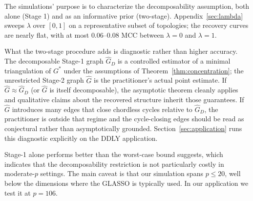 


The simulations' purpose is to characterize the decomposability assumption, both alone (Stage 1) and as an informative prior (two-stage). Appendix~\ref{sec:lambda} sweeps $\lambda$ over $[0,1]$ on a representative subset of topologies; the recovery curves are nearly flat, with at most $0.06$--$0.08$ MCC between $\lambda = 0$ and $\lambda = 1$.

What the two-stage procedure adds is diagnostic rather than higher accuracy. The decomposable Stage-1 graph $\hat G_D$ is a controlled estimator of a minimal triangulation of $G^*$ under the assumptions of Theorem~\ref{thm:concentration}; the unrestricted Stage-2 graph $\hat G$ is the practitioner's actual point estimate. If $\hat G \approx \hat G_D$ (or $\hat G$ is itself decomposable), the asymptotic theorem cleanly applies and qualitative claims about the recovered structure inherit those guarantees. If $\hat G$ introduces many edges that close chordless cycles relative to $\hat G_D$, the practitioner is outside that regime and the cycle-closing edges should be read as conjectural rather than asymptotically grounded. Section~\ref{sec:application} runs this diagnostic explicitly on the DDLY application.

Stage-1 alone performs better than the worst-case bound suggests, which indicates that the decomposability restriction is not particularly costly in moderate-$p$ settings. The main caveat is that our simulation spans $p \le 20$, well below the dimensions where the GLASSO is typically used. In our application we test it at $p = 106$.